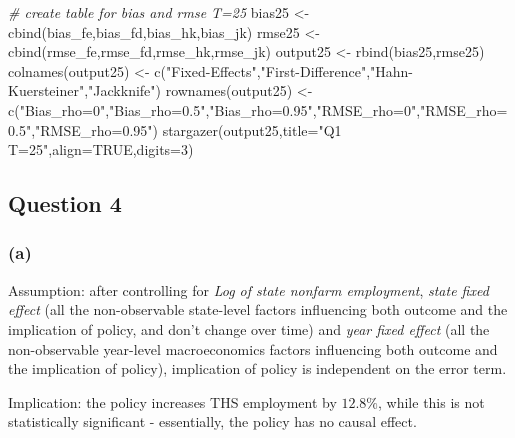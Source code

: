 \documentclass[
]{article}
\newenvironment{Shaded}{\begin{snugshade}}{\end{snugshade}}
\newcommand{\AttributeTok}[1]{\textcolor[rgb]{0.77,0.63,0.00}{#1}}
\newcommand{\CommentTok}[1]{\textcolor[rgb]{0.56,0.35,0.01}{\textit{#1}}}
\newcommand{\ConstantTok}[1]{\textcolor[rgb]{0.00,0.00,0.00}{#1}}
\newcommand{\DecValTok}[1]{\textcolor[rgb]{0.00,0.00,0.81}{#1}}
\newcommand{\FunctionTok}[1]{\textcolor[rgb]{0.00,0.00,0.00}{#1}}
\newcommand{\NormalTok}[1]{#1}
\newcommand{\OtherTok}[1]{\textcolor[rgb]{0.56,0.35,0.01}{#1}}
\newcommand{\StringTok}[1]{\textcolor[rgb]{0.31,0.60,0.02}{#1}}
\begin{document}
\begin{Shaded}
\begin{Highlighting}[]
\CommentTok{\# create table for bias and rmse T=25}
\NormalTok{bias25 }\OtherTok{\textless{}{-}} \FunctionTok{cbind}\NormalTok{(bias\_fe,bias\_fd,bias\_hk,bias\_jk)}
\NormalTok{rmse25 }\OtherTok{\textless{}{-}} \FunctionTok{cbind}\NormalTok{(rmse\_fe,rmse\_fd,rmse\_hk,rmse\_jk)}
\NormalTok{output25 }\OtherTok{\textless{}{-}} \FunctionTok{rbind}\NormalTok{(bias25,rmse25)}
\FunctionTok{colnames}\NormalTok{(output25) }\OtherTok{\textless{}{-}} \FunctionTok{c}\NormalTok{(}\StringTok{"Fixed{-}Effects"}\NormalTok{,}\StringTok{"First{-}Difference"}\NormalTok{,}\StringTok{"Hahn{-}Kuersteiner"}\NormalTok{,}\StringTok{"Jackknife"}\NormalTok{)}
\FunctionTok{rownames}\NormalTok{(output25) }\OtherTok{\textless{}{-}} \FunctionTok{c}\NormalTok{(}\StringTok{"Bias\_rho=0"}\NormalTok{,}\StringTok{"Bias\_rho=0.5"}\NormalTok{,}\StringTok{"Bias\_rho=0.95"}\NormalTok{,}\StringTok{"RMSE\_rho=0"}\NormalTok{,}\StringTok{"RMSE\_rho=0.5"}\NormalTok{,}\StringTok{"RMSE\_rho=0.95"}\NormalTok{)}
\FunctionTok{stargazer}\NormalTok{(output25,}\AttributeTok{title=}\StringTok{"Q1 T=25"}\NormalTok{,}\AttributeTok{align=}\ConstantTok{TRUE}\NormalTok{,}\AttributeTok{digits=}\DecValTok{3}\NormalTok{)}
\end{Highlighting}
\end{Shaded}

\newpage

\hypertarget{question-4}{%
\subsection{Question 4}\label{question-4}}

\hypertarget{a-2}{%
\subsubsection{(a)}\label{a-2}}

Assumption: after controlling for \emph{Log of state nonfarm
employment}, \emph{state fixed effect} (all the non-observable
state-level factors influencing both outcome and the implication of
policy, and don't change over time) and \emph{year fixed effect} (all
the non-observable year-level macroeconomics factors influencing both
outcome and the implication of policy), implication of policy is
independent on the error term.

Implication: the policy increases THS employment by \(12.8\%\), while
this is not statistically significant - essentially, the policy has no
causal effect.
\end{document}
